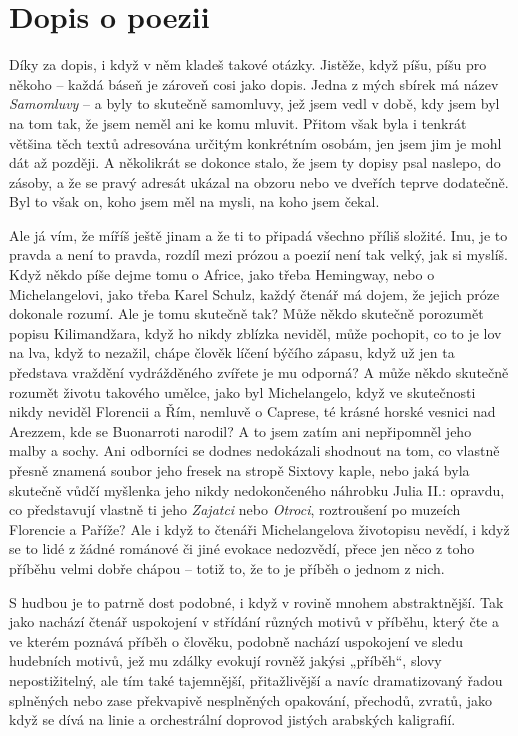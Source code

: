 \section{Dopis o poezii}

\noindent
Díky za dopis, i když v něm kladeš takové otázky. Jistěže, když píšu, píšu pro někoho – každá báseň je zároveň cosi jako dopis. Jedna z mých sbírek má název \textit{Samomluvy} – a byly to skutečně samomluvy, jež jsem vedl v době, kdy jsem byl na tom tak, že jsem neměl ani ke komu mluvit. Přitom však byla i tenkrát většina těch textů adresována určitým konkrétním osobám, jen jsem jim je mohl dát až později. A několikrát se dokonce stalo, že jsem ty dopisy psal naslepo, do zásoby, a že se pravý adresát ukázal na obzoru nebo ve dveřích teprve dodatečně. Byl to však on, koho jsem měl na mysli, na koho jsem čekal.

Ale já vím, že míříš ještě jinam a že ti to připadá všechno příliš složité. Inu, je to pravda a není to pravda, rozdíl mezi prózou a poezií není tak velký, jak si myslíš. Když někdo píše dejme tomu o Africe, jako třeba Hemingway, nebo o Michelangelovi, jako třeba Karel Schulz, každý čtenář má dojem, že jejich próze dokonale rozumí. Ale je tomu skutečně tak?  Může někdo skutečně porozumět popisu Kilimandžara, když ho nikdy zblízka neviděl, může pochopit, co to je lov na lva, když to nezažil, chápe člověk líčení býčího zápasu, když už jen ta představa vraždění vydráždě­ného zvířete je mu odporná? A může někdo skutečně rozumět životu takového umělce, jako byl Michelangelo, když ve skutečnosti nikdy neviděl Florencii a Řím, nemluvě o Caprese, té krásné horské vesnici nad Arezzem, kde se Buonarroti narodil? A to jsem zatím ani nepřipomněl jeho malby a sochy. Ani odborníci se dodnes nedo­kázali shodnout na tom, co vlastně přesně znamená soubor jeho fresek na stropě Sixtovy kaple, nebo jaká byla skutečně vůdčí myšlenka jeho nikdy nedokončeného náhrobku Julia II.: opravdu, co představují vlastně ti jeho \textit{Zajatci} nebo \textit{Otroci}, roztroušení po muzeích Florencie a Paříže? Ale i když to čtenáři Michelangelova životopisu nevědí, i když se to lidé z žádné románové či jiné evokace nedozvědí, přece jen něco z toho příběhu velmi dobře chápou – totiž to, že to je příběh o jednom z nich. 

S hudbou je to patrně dost podobné, i když v rovině mnohem abstraktnější. Tak jako nachází čtenář uspokojení v střídání různých motivů v příběhu, který čte a ve kterém poznává příběh o člověku, podobně nachází uspokojení ve sledu hudebních motivů, jež mu zdálky evokují rovněž jakýsi „příběh“, slovy nepostižitelný, ale tím také tajemnější, přitažlivější a navíc dramatizovaný řadou splněných nebo zase překvapivě nesplněných opakování, přechodů, zvratů, jako když se dívá na linie a orchestrální doprovod jistých arabských kaligrafií.

